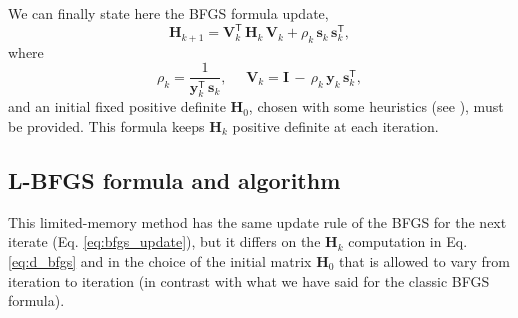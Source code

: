 \documentclass[11pt]{article}
\begin{document}
We can finally state here the BFGS formula update, 
\begin{equation}
    \mathbf{H}_{k+1}=\mathbf{V}_k^\mathsf{T} \, \mathbf{H}_k \, \mathbf{V}_k + \rho_k \, \mathbf{s}_k \, \mathbf{s}_k^\mathsf{T},
    \label{eq:bfgs_H_update}
\end{equation}
where 
\begin{equation}
    \rho_k = \frac{1}{\mathbf{y}_k^\mathsf{T} \, \mathbf{s}_k}, \,\,\,\,\,\,\,\, \mathbf{V}_k = \mathbf{I} \, - \, \rho_k \, \mathbf{y}_k \, \mathbf{s}_k^\mathsf{T},
    \label{}
\end{equation}
and an initial fixed positive definite $\mathbf{H}_0$, chosen with some heuristics (see \cite{Nocedal}), must be provided. This formula keeps $\mathbf{H}_{k}$ positive definite at each iteration.





\subsection{L-BFGS formula and algorithm}\label{sec:l_bfgs_form_and_algo}
This limited-memory method has the same update rule of the BFGS for the next iterate (Eq. \ref{eq:bfgs_update}), but it differs on the $\mathbf{H}_k$ computation in Eq. \ref{eq:d_bfgs} and in the choice of the initial matrix $\mathbf{H}_0$ that is allowed to vary from iteration to iteration (in contrast with what we have said for the classic BFGS formula). 
\end{document}
